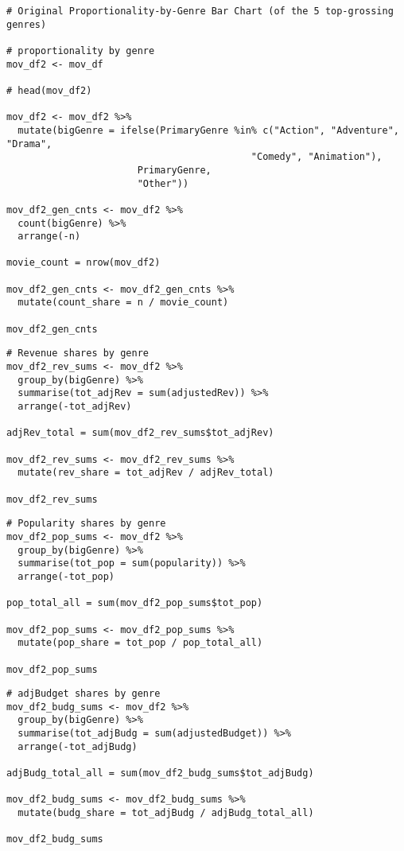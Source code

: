 \begin{lstlisting}
# Original Proportionality-by-Genre Bar Chart (of the 5 top-grossing genres)

# proportionality by genre
mov_df2 <- mov_df

# head(mov_df2)

mov_df2 <- mov_df2 %>%
  mutate(bigGenre = ifelse(PrimaryGenre %in% c("Action", "Adventure", "Drama",
                                           "Comedy", "Animation"),
                       PrimaryGenre,
                       "Other"))

mov_df2_gen_cnts <- mov_df2 %>%
  count(bigGenre) %>%
  arrange(-n)

movie_count = nrow(mov_df2)

mov_df2_gen_cnts <- mov_df2_gen_cnts %>%
  mutate(count_share = n / movie_count)

mov_df2_gen_cnts
\end{lstlisting}

\begin{lstlisting}
# Revenue shares by genre
mov_df2_rev_sums <- mov_df2 %>%
  group_by(bigGenre) %>%
  summarise(tot_adjRev = sum(adjustedRev)) %>%
  arrange(-tot_adjRev)

adjRev_total = sum(mov_df2_rev_sums$tot_adjRev)

mov_df2_rev_sums <- mov_df2_rev_sums %>%
  mutate(rev_share = tot_adjRev / adjRev_total)

mov_df2_rev_sums
\end{lstlisting}

\begin{lstlisting}
# Popularity shares by genre
mov_df2_pop_sums <- mov_df2 %>%
  group_by(bigGenre) %>%
  summarise(tot_pop = sum(popularity)) %>%
  arrange(-tot_pop)

pop_total_all = sum(mov_df2_pop_sums$tot_pop)

mov_df2_pop_sums <- mov_df2_pop_sums %>%
  mutate(pop_share = tot_pop / pop_total_all)

mov_df2_pop_sums
\end{lstlisting}

\begin{lstlisting}
# adjBudget shares by genre
mov_df2_budg_sums <- mov_df2 %>%
  group_by(bigGenre) %>%
  summarise(tot_adjBudg = sum(adjustedBudget)) %>%
  arrange(-tot_adjBudg)

adjBudg_total_all = sum(mov_df2_budg_sums$tot_adjBudg)

mov_df2_budg_sums <- mov_df2_budg_sums %>%
  mutate(budg_share = tot_adjBudg / adjBudg_total_all)

mov_df2_budg_sums
\end{lstlisting}

